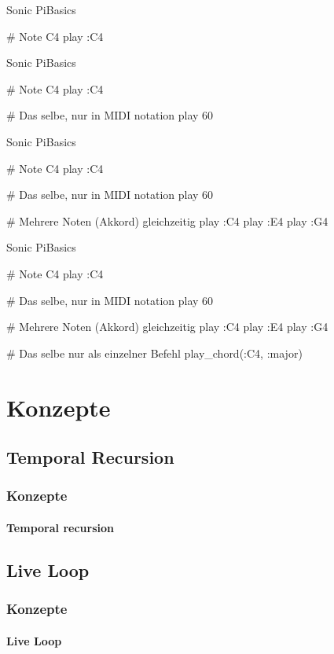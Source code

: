 \documentclass{beamer}
\begin{document}
\begin{frame}[fragile]{Sonic Pi}{Basics}
  \begin{rubycode}
    # Note C4
    play :C4
  \end{rubycode}
\end{frame}
\addtocounter{framenumber}{-1}

\begin{frame}[fragile]{Sonic Pi}{Basics}
  \begin{rubycode}
    # Note C4
    play :C4

    # Das selbe, nur in MIDI notation
    play 60
  \end{rubycode}
\end{frame}
\addtocounter{framenumber}{-1}

\begin{frame}[fragile]{Sonic Pi}{Basics}
  \begin{rubycode}
    # Note C4
    play :C4

    # Das selbe, nur in MIDI notation
    play 60

    # Mehrere Noten (Akkord) gleichzeitig
    play :C4
    play :E4
    play :G4
  \end{rubycode}
\end{frame}
\addtocounter{framenumber}{-1}

\begin{frame}[fragile]{Sonic Pi}{Basics}
  \begin{rubycode}
    # Note C4
    play :C4

    # Das selbe, nur in MIDI notation
    play 60

    # Mehrere Noten (Akkord) gleichzeitig
    play :C4
    play :E4
    play :G4

    # Das selbe nur als einzelner Befehl
    play_chord(:C4, :major)
  \end{rubycode}
\end{frame}

\section{Konzepte}
\subsection{Temporal Recursion}
\begin{frame}
  \frametitle{Konzepte}
  \framesubtitle{Temporal recursion}
\end{frame}

\subsection{Live Loop}
\begin{frame}
  \frametitle{Konzepte}
  \framesubtitle{Live Loop}
\end{frame}
\end{document}
